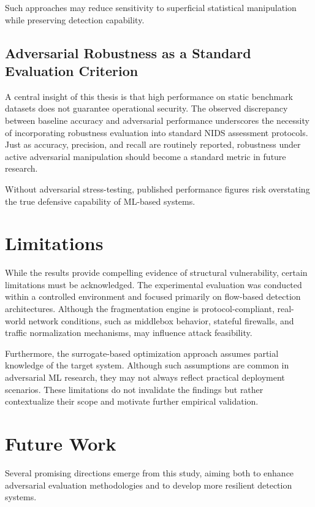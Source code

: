 Such approaches may reduce sensitivity to superficial statistical manipulation while preserving detection capability.

\subsection{Adversarial Robustness as a Standard Evaluation Criterion}

A central insight of this thesis is that high performance on static benchmark datasets does not guarantee operational security. The observed discrepancy between baseline accuracy and adversarial performance underscores the necessity of incorporating robustness evaluation into standard NIDS assessment protocols. Just as accuracy, precision, and recall are routinely reported, robustness under active adversarial manipulation should become a standard metric in future research.

Without adversarial stress-testing, published performance figures risk overstating the true defensive capability of ML-based systems.

\section{Limitations}

While the results provide compelling evidence of structural vulnerability, certain limitations must be acknowledged. The experimental evaluation was conducted within a controlled environment and focused primarily on flow-based detection architectures. Although the fragmentation engine is protocol-compliant, real-world network conditions, such as middlebox behavior, stateful firewalls, and traffic normalization mechanisms, may influence attack feasibility.

Furthermore, the surrogate-based optimization approach assumes partial knowledge of the target system. Although such assumptions are common in adversarial ML research, they may not always reflect practical deployment scenarios. These limitations do not invalidate the findings but rather contextualize their scope and motivate further empirical validation.

\section{Future Work}

Several promising directions emerge from this study, aiming both to enhance adversarial evaluation methodologies and to develop more resilient detection systems.


